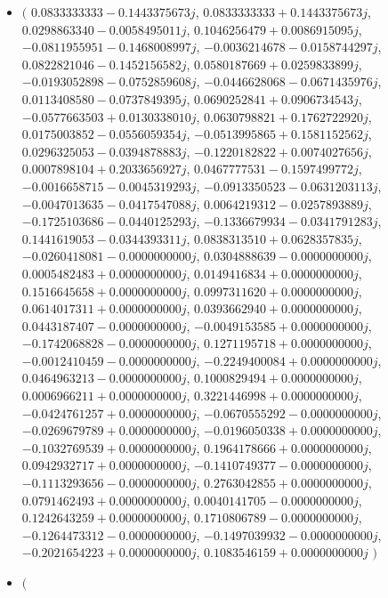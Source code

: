 \documentclass[14pt,a4paper]{article}
\begin{document}
\begin{itemize}
\item
$\big($
$0.0833333333-0.1443375673j$, $0.0833333333+0.1443375673j$, $0.0298863340-0.0058495011j$, $0.1046256479+0.0086915095j$, $-0.0811955951-0.1468008997j$, $-0.0036214678-0.0158744297j$, $0.0822821046-0.1452156582j$, $0.0580187669+0.0259833899j$, $-0.0193052898-0.0752859608j$, $-0.0446628068-0.0671435976j$, $0.0113408580-0.0737849395j$, $0.0690252841+0.0906734543j$, $-0.0577663503+0.0130338010j$, $0.0630798821+0.1762722920j$, $0.0175003852-0.0556059354j$, $-0.0513995865+0.1581152562j$, $0.0296325053-0.0394878883j$, $-0.1220182822+0.0074027656j$, $0.0007898104+0.2033656927j$, $0.0467777531-0.1597499772j$, $-0.0016658715-0.0045319293j$, $-0.0913350523-0.0631203113j$, $-0.0047013635-0.0417547088j$, $0.0064219312-0.0257893889j$, $-0.1725103686-0.0440125293j$, $-0.1336679934-0.0341791283j$, $0.1441619053-0.0344393311j$, $0.0838313510+0.0628357835j$, $-0.0260418081-0.0000000000j$, $0.0304888639-0.0000000000j$, $0.0005482483+0.0000000000j$, $0.0149416834+0.0000000000j$, $0.1516645658+0.0000000000j$, $0.0997311620+0.0000000000j$, $0.0614017311+0.0000000000j$, $0.0393662940+0.0000000000j$, $0.0443187407-0.0000000000j$, $-0.0049153585+0.0000000000j$, $-0.1742068828-0.0000000000j$, $0.1271195718+0.0000000000j$, $-0.0012410459-0.0000000000j$, $-0.2249400084+0.0000000000j$, $0.0464963213-0.0000000000j$, $0.1000829494+0.0000000000j$, $0.0006966211+0.0000000000j$, $0.3221446998+0.0000000000j$, $-0.0424761257+0.0000000000j$, $-0.0670555292-0.0000000000j$, $-0.0269679789+0.0000000000j$, $-0.0196050338+0.0000000000j$, $-0.1032769539+0.0000000000j$, $0.1964178666+0.0000000000j$, $0.0942932717+0.0000000000j$, $-0.1410749377-0.0000000000j$, $-0.1113293656-0.0000000000j$, $0.2763042855+0.0000000000j$, $0.0791462493+0.0000000000j$, $0.0040141705-0.0000000000j$, $0.1242643259+0.0000000000j$, $0.1710806789-0.0000000000j$, $-0.1264473312-0.0000000000j$, $-0.1497039932-0.0000000000j$, $-0.2021654223+0.0000000000j$, $0.1083546159+0.0000000000j$
$\big)$
\item
$\big($

\end{itemize}
\end{document}
